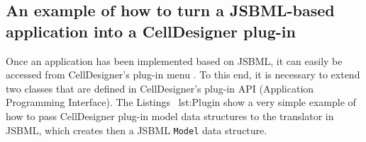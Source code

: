 \documentclass[
  BCOR12mm,
  letterpaper,
  11pt,
  headsepline,
  pointlessnumbers,
  tablecaptionabove,
  onelinecaption,
  headinclude,
  appendixprefix,
  idxtotoc,
  bibtotoc,
  twoside,
  titlepage
]{scrartcl}
\begin{document}
\subsection{An example of how to turn a JSBML-based application into a
CellDesigner plug-in}

Once an application has been implemented based on JSBML, it can easily be
accessed from CellDesigner's plug-in menu \citep{Funahashi2003}. To this end,
it is necessary to extend two classes that are defined in CellDesigner's plug-in
API (Application Programming Interface). The Listings~
{lst:Plugin} show a very simple example of how to pass CellDesigner plug-in
model data structures to the translator in JSBML,
which creates then a JSBML \texttt{Model} data structure.

% 
\end{document}
